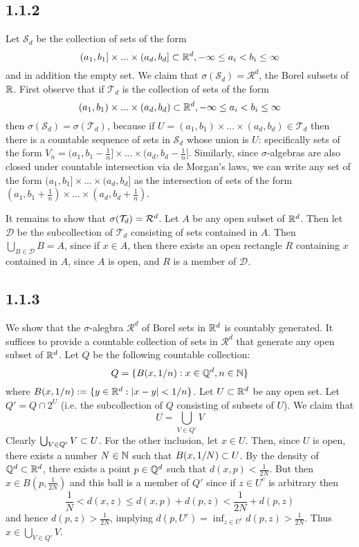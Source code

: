 \documentclass[11pt]{article}
\begin{document}
\subsection*{1.1.2}

Let $\mathcal{S}_d$ be the collection of sets of the form \[(a_1, b_1]\times ... \times (a_d, b_d]\subset {\mathbb R}^d, -\infty\leq a_i < b_i \leq \infty\] and in addition the empty set. We claim that $\sigma(\mathcal{S}_d) = \mathcal{R}^d$, the Borel subsets of ${\mathbb R}$. First observe that if $\mathcal{T}_d$ is the collection of sets of the form \[(a_1, b_1)\times ... \times (a_d, b_d)\subset {\mathbb R}^d, -\infty\leq a_i < b_i \leq \infty\] then $\sigma(\mathcal{S}_d) = \sigma(\mathcal{T}_d)$, because if $U = (a_1, b_1)\times ... \times (a_d, b_d) \in \mathcal{T}_d$ then there is a countable sequence of sets in $\mathcal{S}_d$ whose union is $U$: specifically sets of the form $V_n = (a_1, b_1-\frac{1}{n}]\times ... \times (a_d, b_d-\frac{1}{n}]$. Similarly, since $\sigma$-algebras are also closed under countable intersection via de Morgan's laws, we can write any set of the form $(a_1, b_1]\times ... \times (a_d, b_d]$ as the intersection of sets of the form $(a_1, b_1+\frac{1}{n})\times ... \times (a_d, b_d+\frac{1}{n})$.

It remains to show that $\sigma(\mathcal{T}_d) = \mathcal{R}^d$. Let $A$ be any open subset of ${\mathbb R}^d$. Then let $\mathcal{D}$ be the subcollection of $\mathcal{T}_d$ consisting of sets contained in $A$. Then $\bigcup_{B \in \mathcal{D}} B = A$, since if $x \in A$, then there exists an open rectangle $R$ containing $x$ contained in $A$, since $A$ is open, and $R$ is a member of $\mathcal{D}$.

\subsection*{1.1.3}

We show that the $\sigma$-alegbra $\mathcal{R}^d$ of Borel sets in ${\mathbb R}^d$ is countably generated. It suffices to provide a countable collection of sets in $\mathcal{R}^d$ that generate any open subset of ${\mathbb R}^d$. Let $Q$ be the following countable collection: \[Q = \{B(x, 1/n): x \in {\mathbb Q}^d, n \in {\mathbb N}\}\] where $B(x, 1/n) := \{y \in {\mathbb R}^d: |x-y|<1/n\}$. Let $U \subset {\mathbb R}^d$ be any open set. Let $Q' = Q \cap 2^U$ (i.e. the subcollection of $Q$ consisting of subsets of $U$). We claim that \[U = \bigcup_{V\in Q'} V\] Clearly $\bigcup_{V\in Q'} V \subset U$. For the other inclusion, let $x \in U$. Then, since $U$ is open, there exists a number $N \in {\mathbb N}$ such that $B(x, 1/N) \subset U$. By the density of ${\mathbb Q}^d \subset {\mathbb R}^d$, there exists a point $p \in {\mathbb Q}^d$ such that $d(x,p) < \frac{1}{2N}$. But then $x \in B(p, \frac{1}{2N})$ and this ball is a member of $Q'$ since if $z \in U^c$ is arbitrary then \[\frac{1}{N} < d(x,z) \leq d(x, p) + d(p, z) < \frac{1}{2N} + d(p,z)\] and hence $d(p,z) > \frac{1}{2N}$, implying $d(p, U^c) = \inf_{z\in U^c} d(p, z) > \frac{1}{2N}$. Thus $x \in \bigcup_{V\in Q'} V$.
\end{document}
